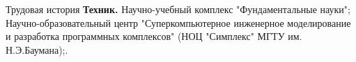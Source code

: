 \begin{rubric}{Трудовая история}
%
%
\entry*[2024 -- 2025]%
	\textbf{Техник.} Научно-учебный комплекс "Фундаментальные науки"; Научно-образовательный центр 
	"Суперкомпьютерное инженерное моделирование и разработка программных комплексов" (НОЦ 
	"Симплекс" МГТУ им. Н.Э.Баумана);.
%
\end{rubric}
